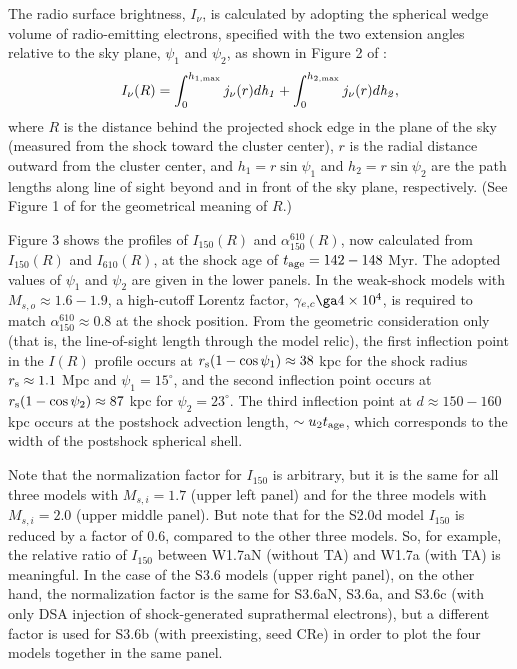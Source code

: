 \documentclass[twocolumn]{aastex61}
\begin{document}
The radio surface brightness, 
$I_{\nu}$, is calculated by adopting the spherical wedge volume of radio-emitting electrons, specified with the
two extension angles relative to the sky plane, $\psi_1$ and $\psi_2$, as shown in Figure 2 of \citet{kang16a}:
\begin{equation}
I_{\nu}(R)= \int_0^{h_{\rm 1, max}} j_{\nu}(r) d {\it h_1}+ \int_0^{h_{\rm 2, max}} j_{\nu}(r) d {\it h_2},
\label{SB}
\end{equation}
where $R$ is the distance behind the projected shock edge in the plane of the sky (measured from the shock toward the cluster center),
$r$ is the radial distance outward from the cluster center,
and $h_1 = r \sin{\psi_1}$ and $h_2 = r \sin{\psi_2}$ are the path lengths along line of sight beyond and in front of the sky plane, respectively. 
(See Figure 1 of \citet{kang15} for the geometrical meaning of $R$.)

Figure 3 shows the profiles of $I_{150} (R)$ and $\alpha_{150}^{610} (R)$, now calculated from $I_{150} (R)$ and $I_{610} (R)$,
at the shock age of $t_{\rm age}=142-148$ Myr. 
The adopted values of $\psi_1$ and $\psi_2$ are given in the lower panels.
In the weak-shock models with $M_{s,o}\approx 1.6-1.9$, a high-cutoff Lorentz factor, 
$\gamma_{e,c}\ga 4\times 10^4$, is required to match $\alpha_{150}^{610}\approx 0.8$ at the shock position.
From the geometric consideration only (that is, the line-of-sight length through the model relic), 
the first inflection point in the $I (R)$ profile occurs at
$r_{\rm s}(1-\cos \psi_1)\approx 38$ kpc for the shock radius $r_{\rm s}\approx 1.1$ Mpc and $\psi_1=15^{\circ}$, and
the second inflection point occurs at $r_{\rm s}(1-\cos \psi_2)\approx 87$ kpc for $\psi_2=23^{\circ}$.
The third inflection point at $d\approx 150-160$ kpc occurs at the postshock advection length, $\sim u_2 t_{\rm age}$,
which corresponds to the width of the postshock spherical shell.

Note that the normalization factor for $I_{150}$ is arbitrary, but it is the same for all three models with $M_{s,i}=1.7$ 
(upper left panel) and for the three models with $M_{s,i}=2.0$ (upper middle panel).
But note that for the S2.0d model $I_{150}$ is reduced by a factor of 0.6, compared to the other three models.
So, for example, the relative ratio of $I_{150}$ between W1.7aN (without TA) and
W1.7a (with TA) is meaningful.
In the case of the S3.6 models (upper right panel), on the other hand, 
the normalization factor is the same for S3.6aN, S3.6a, and S3.6c 
(with only DSA injection of shock-generated suprathermal electrons),
but a different factor is used for S3.6b (with preexisting, seed CRe) in order to plot the four models together in the same panel. 
\end{document}

